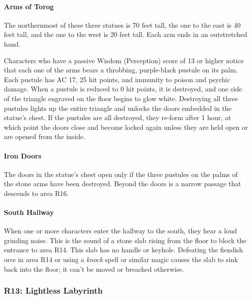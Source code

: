 \documentclass[a4paper, 11pt, bg=full, twocolumn, nooutline]{dndbook}
\begin{document}

\paragraph{Arms of Torog}

The northernmost of these three statues is 70 feet tall, the one to the east is 40 feet tall, and the one to the west is 20 feet tall. Each arm ends in an outstretched hand.

Characters who have a passive Wisdom (Perception) score of 13 or higher notice that each one of the arms bears a throbbing, purple-black pustule on its palm. Each pustule has AC 17, 25 hit points, and immunity to poison and psychic damage. When a pustule is reduced to 0 hit points, it is destroyed, and one side of the triangle engraved on the floor begins to glow white. Destroying all three pustules lights up the entire triangle and unlocks the doors embedded in the statue's chest. If the pustules are all destroyed, they re-form after 1 hour, at which point the doors close and become locked again unless they are held open or are opened from the inside.

\paragraph{Iron Doors}

The doors in the statue's chest open only if the three pustules on the palms of the stone arms have been destroyed. Beyond the doors is a narrow passage that descends to area R16.

\paragraph{South Hallway}

When one or more characters enter the hallway to the south, they hear a loud grinding noise. This is the sound of a stone slab rising from the floor to block the entrance to area R14. This slab has no handle or keyhole. Defeating the fiendish orcs in area R14 or using a \textit{knock} spell or similar magic causes the slab to sink back into the floor; it can't be moved or breached otherwise.

\subsubsection{R13: Lightless Labyrinth}
\end{document}
